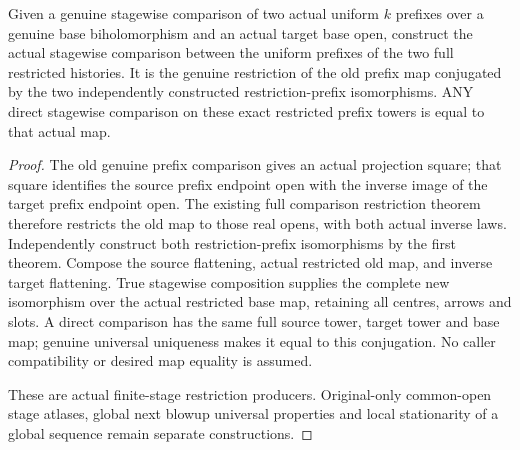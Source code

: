 \begin{theorem}
\label{hir:sharp-actual-curve-uniform-prefix-map-restriction}
\leanok
Given a genuine stagewise comparison of two actual uniform $k$ prefixes
over a genuine base biholomorphism and an actual target base open,
construct the actual stagewise comparison between the uniform prefixes
of the two full restricted histories. It is the genuine restriction
of the old prefix map conjugated by the two independently constructed
restriction-prefix isomorphisms. ANY direct stagewise comparison on
these exact restricted prefix towers is equal to that actual map.
\end{theorem}
\begin{proof}
The old genuine prefix comparison gives an actual projection square;
that square identifies the source prefix endpoint open with the
inverse image of the target prefix endpoint open. The existing full
comparison restriction theorem therefore restricts the old map to
those real opens, with both actual inverse laws. Independently
construct both restriction-prefix isomorphisms by the first theorem.
Compose the source flattening, actual restricted old map, and inverse
target flattening. True stagewise composition supplies the complete
new isomorphism over the actual restricted base map, retaining all
centres, arrows and slots. A direct comparison has the same full
source tower, target tower and base map; genuine universal uniqueness
makes it equal to this conjugation. No caller compatibility or desired
map equality is assumed.

These are actual finite-stage restriction producers. Original-only
common-open stage atlases, global next blowup universal properties and
local stationarity of a global sequence remain separate constructions.
\end{proof}
